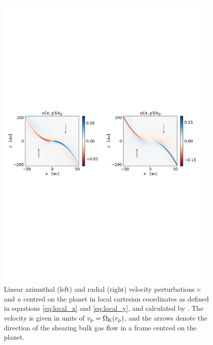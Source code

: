 \begin{figure}
    \centering
    \includegraphics[width = 0.95\textwidth]{figures/linear_box_bollati.pdf}
    \caption{Linear azimuthal (left) and radial (right) velocity perturbations $v$ and $u$ centred on the planet in local cartesian coordinates as defined in equations \ref{eq:local_x} and \ref{eq:local_y}, and calculated by \citet{bollati2021}. The velocity is given in units of $v_{\rm p} = \Omega_{\rm K}(r_{\rm p})$, and the arrows denote the direction of the shearing bulk gas flow in a frame centred on the planet.}
    \label{fig:lin_box_bollati}
\end{figure}

